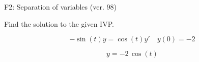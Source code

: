 \begin{exercise}
  \begin{exerciseTitle}F2: Separation of variables (ver. 98)\end{exerciseTitle}
  \begin{exerciseStatement}
    
Find the solution to the given IVP.

    
\[-\sin\left(t\right) y= \cos\left(t\right) y'\hspace{1em} y\left( 0 \right)= -2\]

  \end{exerciseStatement}
  \begin{exerciseAnswer}
    
\[y= -2 \, \cos\left(t\right)\]

  \end{exerciseAnswer}
\end{exercise}